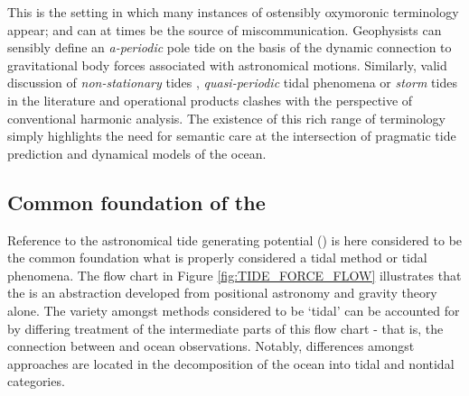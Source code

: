 This is the setting in which many instances of ostensibly oxymoronic terminology appear; and can at times be the source of miscommunication.  Geophysists can sensibly define an \emph{a-periodic} pole tide on the basis of the dynamic connection to gravitational body forces associated with astronomical motions. Similarly,  valid discussion of \emph{non-stationary} tides \cite{Ray:2011tj}, \emph{quasi-periodic} tidal phenomena \citep{Flinchem:2000kp} or \emph{storm} tides \cite{Horsburgh:2008gw} in the literature and operational products clashes with the perspective of conventional harmonic analysis.  The existence of this rich range of terminology simply highlights the need for semantic care at the intersection of pragmatic tide prediction and dynamical models of the ocean.\\


\subsection{Common foundation of the \ATGP{}}
Reference to the astronomical tide generating potential (\ATGP{}) is here considered to be the common foundation what is properly considered a tidal method or tidal phenomena.  The flow chart in Figure \ref{fig:TIDE_FORCE_FLOW} illustrates that the \ATGP{} is an abstraction developed from positional astronomy and gravity theory alone.   The variety amongst methods considered to be `tidal' can be accounted for by differing treatment of the intermediate parts of this flow chart - that is, the connection between \ATGP{} and ocean observations.  Notably, differences amongst approaches are located in the decomposition of the ocean into tidal and nontidal categories.\\

